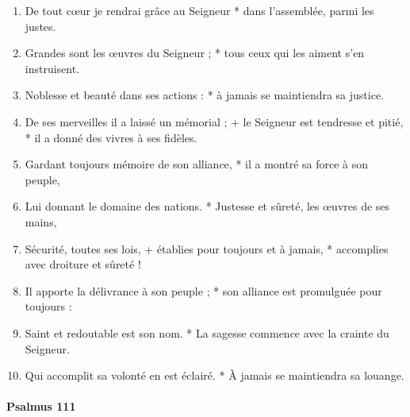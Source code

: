 \documentclass[twoside]{article}
\begin{document}
\begin{paracol}[1]{2}
\begin{enumerate}[wide, itemsep=0mm, labelwidth=!, labelindent=0pt, label=\color{gregoriocolor}\theenumi]
\item De tout cœur je rendrai grâce au Seigneur *
dans l'assemblée, parmi les justes.
\item Grandes sont les œuvres du Seigneur ; *
tous ceux qui les aiment s'en instruisent.
\item Noblesse et beauté dans ses actions : *
à jamais se maintiendra sa justice.
\item De ses merveilles il a laissé un mémorial ; +
le Seigneur est tendresse et pitié, *
il a donné des vivres à ses fidèles.
\item Gardant toujours mémoire de son alliance, *
il a montré sa force à son peuple,
\item Lui donnant le domaine des nations. *
 Justesse et sûreté, les œuvres de ses mains, 
\item Sécurité, toutes ses lois, +
établies pour toujours et à jamais, *
accomplies avec droiture et sûreté !

\item Il apporte la délivrance à son peuple ; *
son alliance est promulguée pour toujours :

\item {} Saint et redoutable est son nom. *
 La sagesse commence avec la crainte du Seigneur.
\item Qui accomplit sa volonté en est éclairé. *
À jamais se maintiendra sa louange.
\end{enumerate}
\newpage
\switchcolumn*

\paragraph{Psalmus 111}




\end{paracol}
\end{document}
